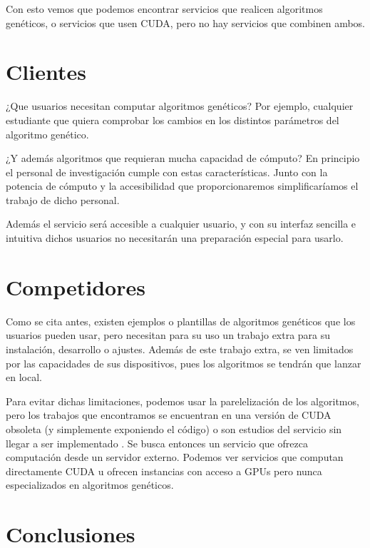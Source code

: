 Con esto vemos que podemos encontrar servicios que realicen algoritmos genéticos, o servicios que usen CUDA, pero no hay servicios que combinen ambos.


\bigskip
\section{Clientes}
\bigskip

¿Que usuarios necesitan computar algoritmos genéticos?
Por ejemplo, cualquier estudiante que quiera comprobar los cambios en los distintos parámetros del algoritmo genético.

¿Y además algoritmos que requieran mucha capacidad de cómputo? En principio el personal de investigación cumple con estas características. Junto con la potencia de cómputo y la accesibilidad que proporcionaremos simplificaríamos el trabajo de dicho personal. 

Además el servicio será accesible a cualquier usuario, y con su interfaz sencilla e intuitiva dichos usuarios no necesitarán una preparación especial para usarlo. 

\bigskip
\section{Competidores}
\bigskip

Como se cita antes, existen ejemplos o plantillas de algoritmos genéticos \cite{agpython} \cite{agjava} \cite{agmatlab} que los usuarios pueden usar, pero necesitan para su uso un trabajo extra para su instalación, desarrollo o ajustes. Además de este trabajo extra, se ven limitados por las capacidades de sus dispositivos, pues los algoritmos se tendrán que lanzar en local.

Para evitar dichas limitaciones, podemos usar la parelelización de los algoritmos, pero los trabajos que encontramos se encuentran en una versión de CUDA obsoleta \cite{paralelizacioncuda} (y simplemente exponiendo el código) o son estudios del servicio sin llegar a ser implementado \cite{optimizacionparalelizacioncuda}. Se busca entonces un servicio que ofrezca computación desde un servidor externo. Podemos ver servicios que computan directamente CUDA \cite{rcuda} u ofrecen instancias con acceso a GPUs \cite{amazoncuda}  pero nunca especializados en algoritmos genéticos.


\bigskip
\section{Conclusiones}
\bigskip

